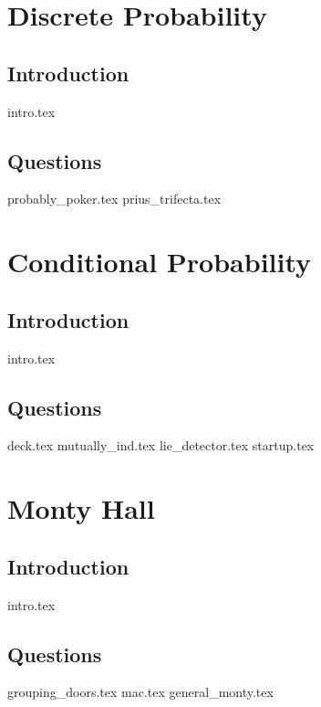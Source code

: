 \documentclass{exam}
\begin{document}
\section{Discrete Probability}
\subsection{Introduction}
{intro.tex}
\subsection{Questions}
\begin{questions}
{probably_poker.tex}
{prius_trifecta.tex}
\end{questions}

\section{Conditional Probability}
\subsection{Introduction}
{intro.tex}
\subsection{Questions}
\begin{questions}
{deck.tex}
{mutually_ind.tex}
{lie_detector.tex}
{startup.tex}
\end{questions}

\section{Monty Hall}
\subsection{Introduction}
{intro.tex}
\subsection{Questions}
\begin{questions}
{grouping_doors.tex}
{mac.tex}
{general_monty.tex}
\end{questions}
\end{document}
